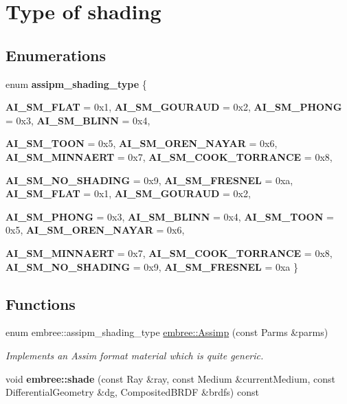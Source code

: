 \hypertarget{group___shading___type}{
\section{Type of shading}
\label{group___shading___type}
}
\subsection*{Enumerations}
\begin{DoxyCompactItemize}
\item 
enum {\bfseries assipm\_\-shading\_\-type} \{ \par
{\bfseries AI\_\-SM\_\-FLAT} =  0x1, 
{\bfseries AI\_\-SM\_\-GOURAUD} =  0x2, 
{\bfseries AI\_\-SM\_\-PHONG} =  0x3, 
{\bfseries AI\_\-SM\_\-BLINN} =  0x4, 
\par
{\bfseries AI\_\-SM\_\-TOON} =  0x5, 
{\bfseries AI\_\-SM\_\-OREN\_\-NAYAR} =  0x6, 
{\bfseries AI\_\-SM\_\-MINNAERT} =  0x7, 
{\bfseries AI\_\-SM\_\-COOK\_\-TORRANCE} =  0x8, 
\par
{\bfseries AI\_\-SM\_\-NO\_\-SHADING} =  0x9, 
{\bfseries AI\_\-SM\_\-FRESNEL} =  0xa, 
{\bfseries AI\_\-SM\_\-FLAT} =  0x1, 
{\bfseries AI\_\-SM\_\-GOURAUD} =  0x2, 
\par
{\bfseries AI\_\-SM\_\-PHONG} =  0x3, 
{\bfseries AI\_\-SM\_\-BLINN} =  0x4, 
{\bfseries AI\_\-SM\_\-TOON} =  0x5, 
{\bfseries AI\_\-SM\_\-OREN\_\-NAYAR} =  0x6, 
\par
{\bfseries AI\_\-SM\_\-MINNAERT} =  0x7, 
{\bfseries AI\_\-SM\_\-COOK\_\-TORRANCE} =  0x8, 
{\bfseries AI\_\-SM\_\-NO\_\-SHADING} =  0x9, 
{\bfseries AI\_\-SM\_\-FRESNEL} =  0xa
 \}
\end{DoxyCompactItemize}
\subsection*{Functions}
\begin{DoxyCompactItemize}
\item 
enum embree::assipm\_\-shading\_\-type \hyperlink{group___shading___type_ga069f80aa98661e3d07a8cfeffdffec5c}{embree::Assimp} (const Parms \&parms)
\begin{DoxyCompactList}\small\item\em Implements an Assim format material which is quite generic. \item\end{DoxyCompactList}\item 
\hypertarget{group___shading___type_ga8123df85b900926c45ae36c662524a77}{
void {\bfseries embree::shade} (const Ray \&ray, const Medium \&currentMedium, const DifferentialGeometry \&dg, CompositedBRDF \&brdfs) const }
\label{group___shading___type_ga8123df85b900926c45ae36c662524a77}

\end{DoxyCompactItemize}
